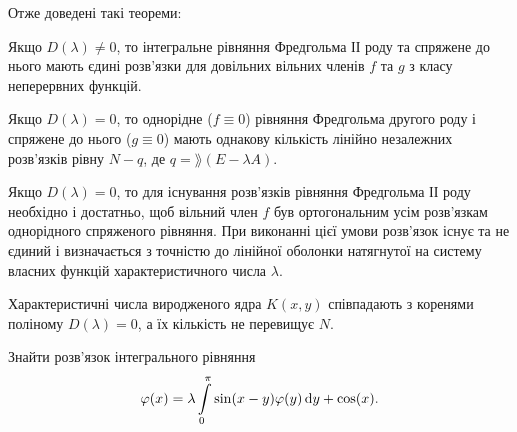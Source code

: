 \newpage

Отже доведені такі теореми:

\begin{theorem}
	Якщо $D(\lambda) \ne 0$, то інтегральне рівняння Фредгольма ІІ роду та спряжене до нього мають єдині розв'язки для довільних вільних членів $f$ та $g$ з класу неперервних функцій.
\end{theorem}

\begin{theorem}
	Якщо $D(\lambda) = 0$, то однорідне ($f \equiv 0$) рівняння Фредгольма другого роду і спряжене до нього ($g \equiv 0$) мають однакову кількість лінійно незалежних розв'язків рівну $N - q$, де $q = \rang(E - \lambda A)$.
\end{theorem}

\begin{theorem}
	Якщо $D(\lambda) = 0$, то для існування розв'язків рівняння Фредгольма ІІ роду необхідно і достатньо, щоб вільний член $f$ був ортогональним усім розв'язкам однорідного спряженого рівняння. При виконанні цієї умови розв'язок існує та не єдиний і визначається з точністю до лінійної оболонки натягнутої на систему власних функцій характеристичного числа $\lambda$.
\end{theorem}

\begin{corollary}
	Характеристичні числа виродженого ядра $K(x, y)$ співпадають з коренями поліному $D(\lambda) = 0$, а їх кількість не перевищує $N$.
\end{corollary}

\newpage

\begin{example}
	Знайти розв'язок інтегрального рівняння 
	\begin{equation*}
		\varphi(x) = \lambda \displaystyle\int\limits_0^\pi \sin(x - y) \varphi(y) \mathop{}\!\mathrm{d} y + \cos(x).
	\end{equation*}
\end{example}

